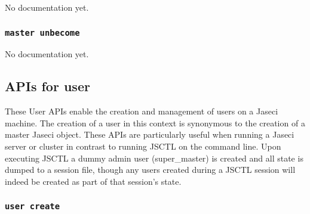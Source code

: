 {No documentation yet.}
\subsubsection{\lstinline[basicstyle=\Large\ttfamily]$master unbecome$}

{No documentation yet.}
\subsection{APIs for user}

\par
These User APIs enable the creation and management of users on a Jaseci machine.
The creation of a user in this context is synonymous to the creation of a master
Jaseci object. These APIs are particularly useful when running a Jaseci server
or cluster in contrast to running JSCTL on the command line. Upon executing JSCTL
a dummy admin user (super\_master) is created and all state is dumped to a session
file, though any users created during a JSCTL session will indeed be created as
part of that session's state.

\subsubsection{\lstinline[basicstyle=\Large\ttfamily]$user create$}

